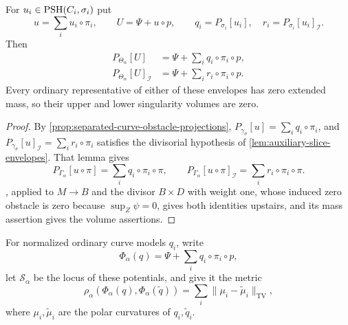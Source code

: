 \begin{lemma}\label{lem:general-auxiliary-product-projections}
For $u_i\in\mathrm{PSH}(C_i,\sigma_i)$ put
\[
 u=\sum_i u_i\circ\pi_i,\qquad U=\Psi+u\circ p,
 \qquad q_i=P_{\sigma_i}[u_i],\quad
 r_i=P_{\sigma_i}[u_i]_{\mathcal I}.
\]
Then
\[
 \begin{aligned}
 P_{\Theta_\alpha}[U]&=\Psi+\sum_iq_i\circ\pi_i\circ p,\\
 P_{\Theta_\alpha}[U]_{\mathcal I}
     &=\Psi+\sum_ir_i\circ\pi_i\circ p.
 \end{aligned}
\]
Every ordinary representative of either of these envelopes has zero extended mass, so their upper and lower singularity volumes are zero.
\end{lemma}
\begin{proof}
By \cref{prop:separated-curve-obstacle-projections}, $P_{\gamma_\sigma}[u]=\sum_iq_i\circ\pi_i$, and $P_{\gamma_\sigma}[u]_{\mathcal I}=\sum_ir_i\circ\pi_i$ satisfies the divisorial hypothesis of \cref{lem:auxiliary-slice-envelopes}. That lemma gives
\[
 P_{\Gamma_\alpha}[u\circ\pi]=\sum_iq_i\circ\pi_i\circ\pi,\qquad
 P_{\Gamma_\alpha}[u\circ\pi]_{\mathcal I}=\sum_ir_i\circ\pi_i\circ\pi.
\]
, applied to $M\to B$ and the divisor $B\times D$ with weight one, whose induced zero obstacle is zero because $\sup_Z\psi=0$, gives both identities upstairs, and its mass assertion gives the volume assertions.
\end{proof}

For normalized ordinary curve models $q_i$, write
\[
 \Phi_\alpha(q)=\Psi+\sum_iq_i\circ\pi_i\circ p,
\]
let $\mathcal S_\alpha$ be the locus of these potentials, and give it the metric
\[
 \rho_\alpha(\Phi_\alpha(q),\Phi_\alpha(\widetilde q))
       =\sum_i\|\mu_i-\widetilde\mu_i\|_{\mathrm{TV}},
\]
where $\mu_i,\widetilde\mu_i$ are the polar curvatures of $q_i,\widetilde q_i$.

